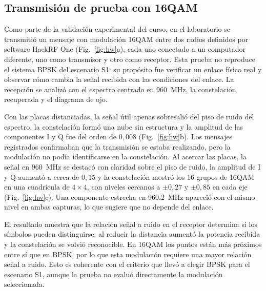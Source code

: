\subsection{Transmisión de prueba con 16QAM}\label{subsec:prueba16qam}

Como parte de la validación experimental del curso, en el laboratorio se
transmitió un mensaje con modulación 16QAM entre dos radios definidos por
software HackRF One (Fig.~\ref{fig:hw}a), cada uno conectado a un computador
diferente, uno como transmisor y otro como receptor. Esta prueba no reproduce
el sistema BPSK del escenario S1: su propósito fue verificar un enlace físico
real y observar cómo cambia la señal recibida con las condiciones del enlace.
La recepción se analizó con el espectro centrado en \SI{960}{\mega\hertz}, la
constelación recuperada y el diagrama de ojo.

Con las placas distanciadas, la señal útil apenas sobresalió del piso de ruido
del espectro, la constelación formó una nube sin estructura y la amplitud de
las componentes I y Q fue del orden de $0{,}008$ (Fig.~\ref{fig:hw}b). Los
mensajes registrados confirmaban que la transmisión se estaba realizando, pero
la modulación no podía identificarse en la constelación. Al acercar las placas,
la señal en \SI{960}{\mega\hertz} se destacó con claridad sobre el piso de
ruido, la amplitud de I y Q aumentó a cerca de $0{,}15$ y la constelación mostró
los 16 grupos de 16QAM en una cuadrícula de $4\times4$, con niveles cercanos a
$\pm0{,}27$ y $\pm0{,}85$ en cada eje (Fig.~\ref{fig:hw}c). Una componente
estrecha en \SI{960,2}{\mega\hertz} apareció con el mismo nivel en ambas
capturas, lo que sugiere que no depende del enlace.

El resultado muestra que la relación señal a ruido en el receptor determina si
los símbolos pueden distinguirse: al reducir la distancia aumentó la potencia
recibida y la constelación se volvió reconocible. En 16QAM los puntos están más
próximos entre sí que en BPSK, por lo que esta modulación requiere una mayor
relación señal a ruido. Esto es coherente con el criterio que llevó a elegir
BPSK para el escenario S1, aunque la prueba no evaluó directamente la
modulación seleccionada.

